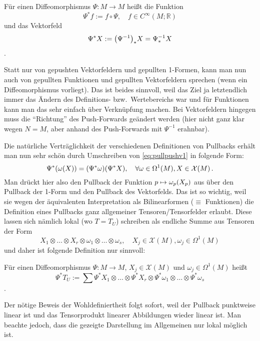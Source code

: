 \documentclass[../H_Analysis_main.tex]{subfiles}
\begin{document}
\begin{defi}
Für einen Diffeomorphismus $\Psi: M \rightarrow M$ heißt die Funktion
\begin{equation}
\Psi^* f := f \circ \Psi, \quad f \in C^\infty(M; \mathbb{R})
\end{equation}
 und das Vektorfeld
\begin{equation}
\Psi^* X := \qty(\Psi^{-1})_* X = \Psi^{-1}_* X
\end{equation}
.
\end{defi}

Statt nur von gepushten Vektorfeldern und gepullten 1-Formen, kann man nun auch von gepullten Funktionen und gepullten Vektorfeldern sprechen (wenn ein Diffeomorphismus vorliegt). Das ist beides sinnvoll, weil das Ziel ja letztendlich immer das Ändern des Definitions- bzw.~Wertebereichs war und für Funktionen kann man das sehr einfach über Verknüpfung machen. Bei Vektorfeldern hingegen muss die \enquote{Richtung} des Push-Forwards geändert werden (hier nicht ganz klar wegen $N = M$, aber anhand des Push-Forwards mit $\Psi^{-1}$ erahnbar).

Die natürliche Verträglichkeit der verschiedenen Definitionen von Pullbacks erhält man nun sehr schön durch Umschreiben von \eqref{eq:pullpushv1} in folgende Form:
\begin{equation}\label{eq:pullpushv2}
\Psi^*\qty(\omega(X)) = \qty(\Psi^* \omega) \qty(\Psi^* X), \quad \forall \omega \in \Omega^1(M), X \in \mathcal{X}(M) \, .
\end{equation}
Man drückt hier also den Pullback der Funktion $p \mapsto \omega_p\qty(X_p)$ aus über den Pullback der 1-Form und den Pullback des Vektorfelds. Das ist so wichtig, weil sie wegen der äquivalenten Interpretation als Bilinearformen ($\equiv$ Funktionen) die Definition eines Pullbacks ganz allgemeiner Tensoren/Tensorfelder erlaubt. Diese lassen sich nämlich lokal (wo $T = T_U$) schreiben als endliche Summe aus Tensoren der Form
\begin{equation*}
X_1 \otimes \dots \otimes X_r \otimes \omega_1 \otimes \dots \otimes \omega_s, \quad X_j \in \mathcal{X}(M), \omega_j \in \Omega^1(M)
\end{equation*}
und daher ist folgende Definition nur sinnvoll:

\begin{defi}
Für einen Diffeomorphismus $\Psi: M \rightarrow M$, $X_j \in \mathcal{X}(M)$ und $\omega_j \in \Omega^1(M)$ heißt
\begin{equation}
\Psi^* T_U := \sum \Psi^* X_1 \otimes \dots \otimes \Psi^* X_r \otimes \Psi^* \omega_1 \otimes \dots \otimes \Psi^* \omega_s
\end{equation}
.
\end{defi}
Der nötige Beweis der Wohldefiniertheit folgt sofort, weil der Pullback punktweise linear ist und das Tensorprodukt linearer Abbildungen wieder linear ist. Man beachte jedoch, dass die gezeigte Darstellung im Allgemeinen nur lokal möglich ist.
\end{document}
